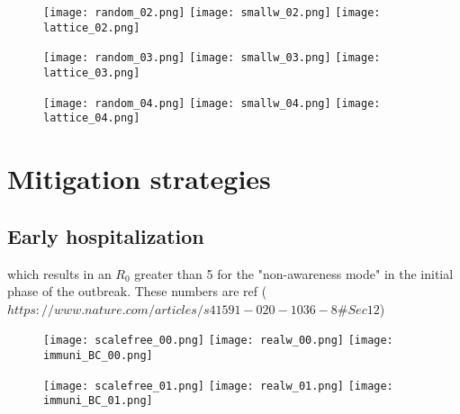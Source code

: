 \documentclass[DIV=12, BCOR=0pt]{scrartcl}  %
\begin{document}
  \begin{figure}[h!]
		\centering
	 	\texttt{[image: random\_02.png]}
	 	\texttt{[image: smallw\_02.png]}
	 	\texttt{[image: lattice\_02.png]}
		
	 	\texttt{[image: random\_03.png]}
	 	\texttt{[image: smallw\_03.png]}
	 	\texttt{[image: lattice\_03.png]}
	  	
	 	\texttt{[image: random\_04.png]}
	 	\texttt{[image: smallw\_04.png]}
	 	\texttt{[image: lattice\_04.png]}
	 		
  	\caption{ }
  	\label{fig:outcomes0}
  \end{figure}
  
  \clearpage
  
  
  
  \section{Mitigation strategies} %
  \label{sec:immuni}
    
   
   \subsection{Early hospitalization}
   which results in an $R_0$ greater than 5 for the "non-awareness mode" in the initial phase of the outbreak. These numbers are
   ref ($https://www.nature.com/articles/s41591-020-1036-8\#Sec12$)
   
   
   \clearpage
   
   \begin{figure}[h!]
   	\centering
   	\texttt{[image: scalefree\_00.png]}
   	\texttt{[image: realw\_00.png]}
   	\texttt{[image: immuni\_BC\_00.png]}
   	
   	\texttt{[image: scalefree\_01.png]}
   	\texttt{[image: realw\_01.png]}
   	\texttt{[image: immuni\_BC\_01.png]}
   	\caption{ }
   	\label{fig:networks1}
   \end{figure}  	
   
\end{document}

